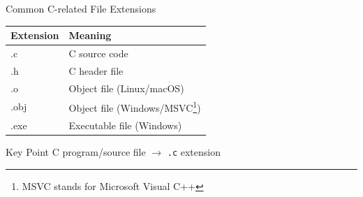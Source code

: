 \documentclass[aspectratio=169]{beamer}
\begin{document}
	\begin{frame}{Common C-related File Extensions}
		
		\begin{table}
			\centering
			\renewcommand{\arraystretch}{1.5}
			\begin{tabular}{>{\ttfamily}p{} p{}}
				\textbf{Extension} & \textbf{Meaning} \\ \hline
				.c   & C source code \\
				.h   & C header file \\
				.o   & Object file (Linux/macOS) \\
				.obj & Object file (Windows/MSVC\footnote{MSVC stands for Microsoft Visual C++}) \\
				.exe & Executable file (Windows)
			\end{tabular}
		\end{table}
		
		
		\begin{block}{Key Point}
			\centering
			\large
			C program/source file $\longrightarrow$ \texttt{.c} extension
		\end{block}
		
	\end{frame}
	
\end{document}
